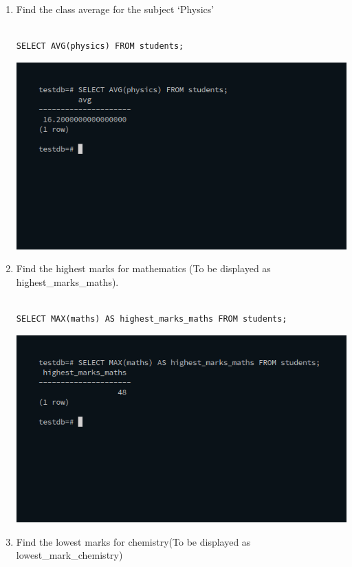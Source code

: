 \begin{enumerate}
\item Find the class average for the subject ‘Physics’\newline
\begin{verbatim}

SELECT AVG(physics) FROM students;

\end{verbatim}
\newline
\includegraphics[width=\linewidth]{../Images/Aggregate/1.png}\newline
\item Find the highest marks for mathematics (To be displayed as highest\_marks\_maths).\newline
\begin{verbatim}

SELECT MAX(maths) AS highest_marks_maths FROM students;

\end{verbatim}
\newline
\includegraphics[width=\linewidth]{../Images/Aggregate/2.png}\newline
\item Find the lowest marks for chemistry(To be displayed as lowest\_mark\_chemistry)\newline
\begin{verbatim}


\end{verbatim}
\end{enumerate}

